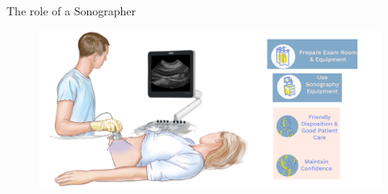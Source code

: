 {
    \begin{frame}{The role of a Sonographer}
      \begin{figure}
        \centering
        \includegraphics[width=1.0\textwidth]{./figures/sonographer/versions/drawing-v01.png}
      \end{figure}
\end{frame}
}
